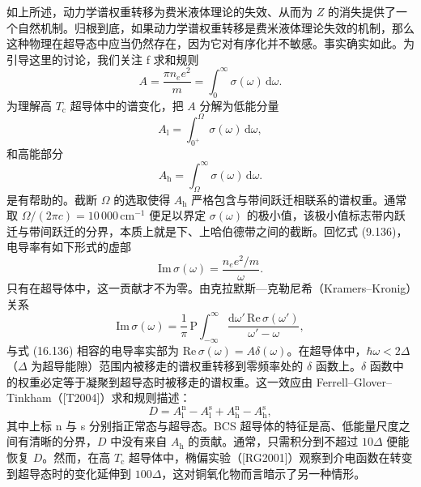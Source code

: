 如上所述，动力学谱权重转移为费米液体理论的失效、从而为 $Z$ 的消失提供了一个自然机制。归根到底，如果动力学谱权重转移是费米液体理论失效的机制，那么这种物理在超导态中应当仍然存在，因为它对有序化并不敏感。事实确实如此。为引导这里的讨论，我们关注 f 求和规则
\begin{equation*}
A=\frac{\pi n_{e}e^{2}}{m}=\int_{0}^{\infty}\sigma(\omega)\,\mathrm{d}\omega.\tag{16.133}
\end{equation*}
为理解高 $T_{\mathrm{c}}$ 超导体中的谱变化，把 $A$ 分解为低能分量
\begin{equation*}
A_{\mathrm{l}}=\int_{0^{+}}^{\Omega}\sigma(\omega)\,\mathrm{d}\omega,\tag{16.134}
\end{equation*}
和高能部分
\begin{equation*}
A_{\mathrm{h}}=\int_{\Omega}^{\infty}\sigma(\omega)\,\mathrm{d}\omega.\tag{16.135}
\end{equation*}
是有帮助的。截断 $\Omega$ 的选取使得 $A_{\mathrm{h}}$ 严格包含与带间跃迁相联系的谱权重。通常取 $\Omega/(2\pi c)=10\,000\,\mathrm{cm}^{-1}$ 便足以界定 $\sigma(\omega)$ 的极小值，该极小值标志带内跃迁与带间跃迁的分界，本质上就是下、上哈伯德带之间的截断。回忆式 (9.136)，电导率有如下形式的虚部
\begin{equation*}
\mathrm{Im}\,\sigma(\omega)=\frac{n_{e}e^{2}/m}{\omega}.\tag{16.136}
\end{equation*}
只有在超导体中，这一贡献才不为零。由克拉默斯—克勒尼希（Kramers--Kronig）关系
\begin{equation*}
\mathrm{Im}\,\sigma(\omega)=\frac{1}{\pi}\,\mathrm{P}\int_{-\infty}^{\infty}\frac{\mathrm{d}\omega'\,\mathrm{Re}\,\sigma(\omega')}{\omega'-\omega},\tag{16.137}
\end{equation*}
与式 (16.136) 相容的电导率实部为 $\mathrm{Re}\,\sigma(\omega)=A\delta(\omega)$。在超导体中，$\hbar\omega<2\Delta$（$\Delta$ 为超导能隙）范围内被移走的谱权重转移到零频率处的 $\delta$ 函数上。$\delta$ 函数中的权重必定等于凝聚到超导态时被移走的谱权重。这一效应由 Ferrell--Glover--Tinkham（[T2004]）求和规则描述：
\begin{equation*}
D=A_{\mathrm{l}}^{\mathrm{n}}-A_{\mathrm{l}}^{\mathrm{s}}+A_{\mathrm{h}}^{\mathrm{n}}-A_{\mathrm{h}}^{\mathrm{s}},\tag{16.138}
\end{equation*}
其中上标 n 与 s 分别指正常态与超导态。BCS 超导体的特征是高、低能量尺度之间有清晰的分界，$D$ 中没有来自 $A_{\mathrm{h}}$ 的贡献。通常，只需积分到不超过 $10\Delta$ 便能恢复 $D$。然而，在高 $T_{\mathrm{c}}$ 超导体中，椭偏实验（[RG2001]）观察到介电函数在转变到超导态时的变化延伸到 $100\Delta$，这对铜氧化物而言暗示了另一种情形。

